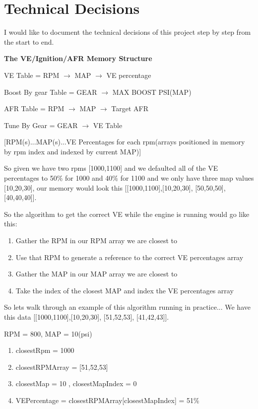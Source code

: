 \documentclass{article}
\begin{document}
\section{Technical Decisions}
I would like to document the technical decisions of this project step by step from the start to end.
\vspace{0.5cm}

\noindent
\textbf{The VE/Ignition/AFR Memory Structure}
\vspace{0.5cm}

VE Table =  RPM $\rightarrow$ MAP $\rightarrow$ VE percentage

Boost By gear Table = GEAR $\rightarrow$  MAX BOOST PSI(MAP)

AFR Table = RPM $\rightarrow$ MAP $\rightarrow$ Target AFR

Tune By Gear = GEAR $\rightarrow$ VE Table

\vspace{0.5cm}
[RPM(s)...MAP(s)...VE Percentages for each rpm(arrays positioned in memory by rpm index and indexed by current MAP)]

\vspace{0.5cm}
So given we have two rpms [1000,1100] and we defaulted all of the VE percentages to 50\% for 1000 and 40\% for 1100 and we only have three map values [10,20,30], our memory would look this [[1000,1100],[10,20,30], [50,50,50], [40,40,40]].


\vspace{0.5cm}
So the algorithm to get the correct VE while the engine is running would go like this:
\begin{enumerate}
    \item Gather the RPM in our RPM array we are closest to
    \item Use that RPM to generate a reference to the correct VE percentages array
    \item Gather the MAP in our MAP array we are closest to
    \item Take the index of the closest MAP and index the VE percentages array
\end{enumerate}

\vspace{0.5cm}
So lets walk through an example of this algorithm running in practice... We have this data [[1000,1100],[10,20,30], [51,52,53], [41,42,43]]. 

\vspace{0.5cm}
RPM = 800, MAP = 10(psi)
\begin{enumerate}
    \item closestRpm = 1000
    \item closestRPMArray = [51,52,53]
    \item closestMap = 10 , closestMapIndex = 0
    \item VEPercentage = closestRPMArray[closestMapIndex] = 51\%
\end{enumerate} 
\end{document}
